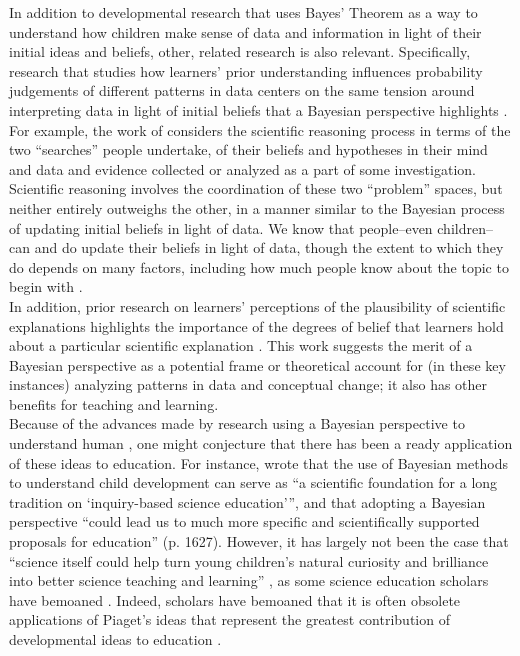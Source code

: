 \documentclass[man, floatsintext]{apa7} %
\begin{document}
In addition to developmental research that uses Bayes' Theorem as a way to understand how children make sense of data and information in light of their initial ideas and beliefs, other, related research is also relevant. Specifically, research that studies how learners’ prior understanding influences probability judgements of different patterns in data centers on the same tension around interpreting data in light of initial beliefs that a Bayesian perspective highlights \parencite[e.g., ][]{kd88, mkm07, ssc07}. For example, the work of \textcite{kd88} considers the scientific reasoning process in terms of the two “searches” people undertake, of their beliefs and hypotheses in their mind and data and evidence collected or analyzed as a part of some investigation. Scientific reasoning involves the coordination of these two “problem” spaces, but neither entirely outweighs the other, in a manner similar to the Bayesian process of updating initial beliefs in light of data. We know that people--even children--can and do update their beliefs in light of data, though the extent to which they do depends on many factors, including how much people  know about the topic to begin with \parencite{mkk17}. \\

In addition, prior research on learners' perceptions of the plausibility of scientific explanations highlights the importance of the degrees of belief that learners hold about a particular scientific explanation \parencite[e.g., ][]{lombardi2013plausibility, lombardi2016plausibility}. This work suggests the merit of a Bayesian perspective as a potential frame or theoretical account for (in these key instances) analyzing patterns in data and conceptual change; it also has other benefits for teaching and learning. \\

Because of the advances made by research using a Bayesian perspective to understand human  \parencite{gt07, gw12}, one might conjecture that there has been a ready application of these ideas to education. For instance, \textcite{g12} wrote that the use of Bayesian methods to understand child development can serve as ``a scientific foundation for a long tradition on `inquiry-based science education''', and that adopting a Bayesian perspective ``could lead us to much more specific and scientifically supported proposals for education'' (p. 1627). However, it has largely not been the case that ``science itself could help turn young children's natural curiosity and brilliance into better science teaching and learning'' \parencite[p. 1627]{g12}, as some science education scholars have bemoaned \parencite{ls15}. Indeed, scholars have bemoaned that it is often obsolete applications of Piaget’s ideas \parencite[e.g., ][]{pi69} that represent the greatest contribution of developmental ideas to education \parencite{ls07}. \\
\end{document}
